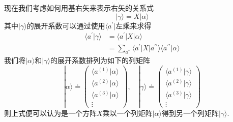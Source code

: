 现在我们考虑如何用基右矢来表示右矢的关系式
\begin{equation}
	|\gamma\rangle=X|\alpha\rangle 
\end{equation}
其中$|\gamma\rangle$的展开系数可以通过使用$\langle a^{'}|$左乘来求得
\begin{equation}
	\begin{aligned}\langle a^{\prime}|\gamma\rangle&=\langle a^{\prime}| X|\alpha\rangle\\&=\sum_{a^{\prime\prime}}\langle a^{\prime}| X| a^{\prime\prime}\rangle\langle a^{\prime\prime}|\alpha\rangle\end{aligned}
\end{equation}
我们将$|\alpha\rangle$和$|\gamma\rangle$的展开系数排列为如下的列矩阵
\begin{equation}
	|\alpha\rangle\doteq\begin{pmatrix}\langle a^{(1)}|\alpha\rangle\\\langle a^{(2)}|\alpha\rangle\\\langle a^{(3)}|\alpha\rangle\\\vdots\end{pmatrix},\quad|\gamma\rangle\doteq
	\begin{pmatrix}\langle a^{(1)}|\gamma\rangle\\\langle a^{(2)}|\gamma\rangle\\\langle a^{(3)}|\gamma\rangle\\\vdots\end{pmatrix}
\end{equation}
则上式便可以认为是一个方阵$X$乘以一个列矩阵$|\alpha\rangle$得到另一个列矩阵$|\gamma\rangle$.

